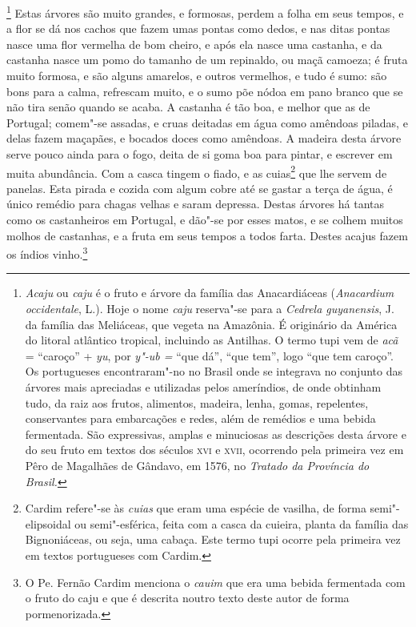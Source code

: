 \footnote{ \textit{Acaju} ou \textit{caju} é
o fruto e árvore da família das Anacardiáceas (\textit{Anacardium
occidentale}, L.). Hoje o nome \textit{caju} reserva"-se para a
\textit{Cedrela guyanensis}, J. da família das Meliáceas, que vegeta
na Amazônia. É originário da América do litoral atlântico tropical,
incluindo as Antilhas. O termo tupi vem de \textit{acã} = ``caroço'' +
\textit{yu}, por \textit{y"-ub =} ``que dá'', ``que tem'', logo ``que tem
caroço''. Os portugueses encontraram"-no no Brasil onde se integrava no
conjunto das árvores mais apreciadas e utilizadas pelos ameríndios, de
onde obtinham tudo, da raiz aos frutos, alimentos, madeira, lenha,
gomas, repelentes, conservantes para embarcações e redes, além de
remédios e uma bebida fermentada. São expressivas, amplas e minuciosas
as descrições desta árvore e do seu fruto em textos dos séculos \textsc{xvi} e
\textsc{xvii}, ocorrendo pela primeira vez em Pêro de Magalhães de Gândavo, em 1576,
no \textit{Tratado da Província do Brasil.}} Estas árvores
são muito grandes, e formosas, perdem a folha em seus tempos, e a flor
se dá nos cachos que fazem umas pontas como dedos, e nas ditas pontas
nasce uma flor vermelha de bom cheiro, e após ela nasce uma castanha, e
da castanha nasce um pomo do tamanho de um repinaldo, ou maçã camoeza;
é fruta muito formosa, e são alguns amarelos, e outros vermelhos, e
tudo é sumo: são bons para a calma, refrescam muito, e o sumo põe nódoa
em pano branco que se não tira senão quando se acaba. A castanha é tão
boa, e melhor que as de Portugal; comem"-se assadas, e cruas deitadas em
água como amêndoas piladas, e delas fazem maçapães, e bocados doces
como amêndoas. A madeira desta árvore serve pouco ainda para o fogo,
deita de si goma boa para pintar, e escrever em muita abundância. Com a
casca tingem o fiado, e as cuias\footnote{ Cardim refere"-se às
\textit{cuias} que eram uma espécie de vasilha, de forma
semi"-elipsoidal ou semi"-esférica, feita com a casca da cuieira, planta
da família das Bignoniáceas, ou seja, uma cabaça. Este termo tupi
ocorre pela primeira vez em textos portugueses com Cardim.} que lhe
servem de panelas. Esta pirada e cozida com algum cobre até se gastar a
terça de água, é único remédio para chagas velhas e saram depressa.
Destas árvores há tantas como os castanheiros em Portugal, e dão"-se por
esses matos, e se colhem muitos molhos de castanhas, e a fruta em seus
tempos a todos farta. Destes acajus fazem os índios vinho.\footnote{ O
Pe. Fernão Cardim menciona o \textit{cauim} que era uma bebida
fermentada com o fruto do caju e que é descrita noutro texto deste
autor de forma pormenorizada.} 

